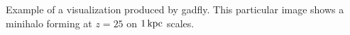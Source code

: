 Example of a visualization produced by gadfly.  This particular image shows a minihalo forming at $z=25$ on $1\,{\rm kpc}$ scales.